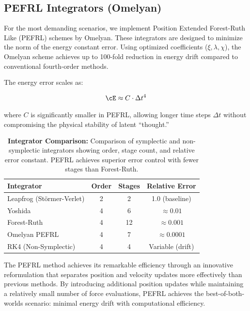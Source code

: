 \documentclass[12pt,a4paper]{article}
\begin{document}
\subsection{PEFRL Integrators (Omelyan)}

For the most demanding scenarios, we implement Position Extended Forest-Ruth Like (PEFRL) schemes by Omelyan. These integrators are designed to minimize the norm of the energy constant error. Using optimized coefficients ($\xi, \lambda, \chi$), the Omelyan scheme achieves up to 100-fold reduction in energy drift compared to conventional fourth-order methods.

The energy error scales as:

\begin{equation}
\cE \approx C \cdot \Delta t^4
\end{equation}

where $C$ is significantly smaller in PEFRL, allowing longer time steps $\Delta t$ without compromising the physical stability of latent ``thought.''

\begin{table}[htbp]
\centering
\begin{tabular}{@{}lccc@{}}
\toprule
\textbf{Integrator} & \textbf{Order} & \textbf{Stages} & \textbf{Relative Error} \\
\midrule
Leapfrog (Störmer-Verlet) & 2 & 2 & 1.0 (baseline) \\
Yoshida & 4 & 6 & $\approx 0.01$ \\
Forest-Ruth & 4 & 12 & $\approx 0.001$ \\
Omelyan PEFRL & 4 & 7 & $\approx 0.0001$ \\
\midrule
RK4 (Non-Symplectic) & 4 & 4 & Variable (drift) \\
\bottomrule
\end{tabular}
\caption{\textbf{Integrator Comparison:} Comparison of symplectic and 
         non-symplectic integrators showing order, stage count, and 
         relative error constant. PEFRL achieves superior error control 
         with fewer stages than Forest-Ruth.}
\label{tab:integrators}
\end{table}

The PEFRL method achieves its remarkable efficiency through an innovative reformulation that separates position and velocity updates more effectively than previous methods. By introducing additional position updates while maintaining a relatively small number of force evaluations, PEFRL achieves the best-of-both-worlds scenario: minimal energy drift with computational efficiency.
\end{document}
